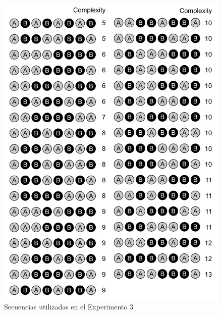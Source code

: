 \begin{figure}[t!]
      \includegraphics[scale=0.8]{figuras/plosbio/journal.pcbi.1008598.s003.png}
      \centering
      \caption{Secuencias utilizadas en el Experimento 3}
      \label{PlosBIO-S3}
\end{figure}


